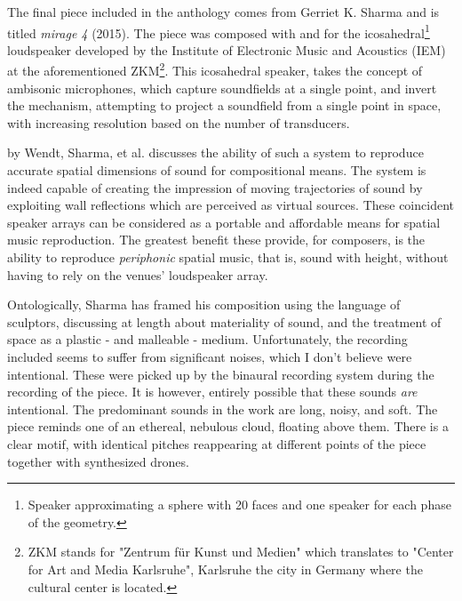 The final piece included in the anthology \cite{hagan2017sound} comes from Gerriet K. Sharma and is titled \textit{mirage 4} (2015). The piece was composed with and for the icosahedral\footnote{Speaker approximating a sphere with 20 faces and one speaker for each phase of the geometry.} loudspeaker developed by the Institute of Electronic Music and Acoustics (IEM) at the aforementioned ZKM\footnote{ZKM stands for "Zentrum für Kunst und Medien" which translates to "Center for Art and Media Karlsruhe", Karlsruhe the city in Germany where the cultural center is located.}. This icosahedral speaker, takes the concept of ambisonic microphones, which capture soundfields at a single point, and invert the mechanism, attempting to project a soundfield from a single point in space, with increasing resolution based on the number of transducers. 

\cite{wendt2017perception} by Wendt, Sharma, et al. discusses the ability of such a system to reproduce accurate spatial dimensions of sound for compositional means. The system is indeed capable of creating the impression of moving trajectories of sound by exploiting wall reflections which are perceived as virtual sources. These coincident speaker arrays can be considered as a portable and affordable means for spatial music reproduction. The greatest benefit these provide, for composers, is the ability to reproduce \textit{periphonic} spatial music, that is, sound with height, without having to rely on the venues' loudspeaker array. 

Ontologically, Sharma has framed his composition using the language of sculptors, discussing at length about materiality of sound, and the treatment of space as a plastic - and malleable - medium. Unfortunately, the recording included seems to suffer from significant noises, which I don't believe were intentional. These were picked up by the binaural recording system during the recording of the piece. It is however, entirely possible that these sounds \textit{are} intentional. The predominant sounds in the work are long, noisy, and soft. The piece reminds one of an ethereal, nebulous cloud, floating above them. There is a clear motif, with identical pitches reappearing at different points of the piece together with synthesized drones. 
 

